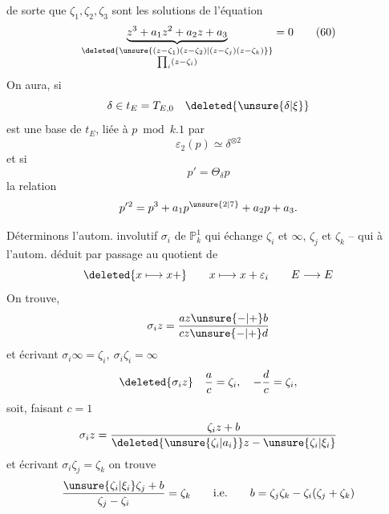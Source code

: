 de sorte que $\zeta_1,\zeta_2,\zeta_3$ sont les solutions de l'équation
\[
\underbrace{z^3+a_1z^2+a_2z+a_3}_{\substack{\deleted{\unsure{(z-\zeta_1)(z-\zeta_2)|(z-\zeta_j)(z-\zeta_k)}}\\\prod_i(z-\zeta_i)}}=0\tag*{(60)}
\]
On aura,  si
\[
\delta\in t_E=T_{E,0}\quad\deleted{\unsure{\delta|\xi}}
\]
est une base de $t_E$, liée à $p\bmod k.1$ par
\[
\varepsilon_2(p)\simeq\delta^{\otimes2}
\]
et si
\[
p'=\Theta_\delta p
\]
la relation
\[
p'{}^2=p^3+a_1p^{\unsure{2|7}}+a_2p+a_3.
\]

Déterminons l'autom. involutif $\sigma_i$ de $\mathbb{P}^1_k$ qui échange $\zeta_i$ et $\infty$, $\zeta_j$ et $\zeta_k$ -- qui  à l'autom. déduit par passage au quotient de
\[
\deleted{x\longmapsto x+}\qquad x\longmapsto x+\varepsilon_i\qquad E\longrightarrow E
\]
On trouve, 
\[
\sigma_i z=\frac{az\unsure{-|+}b}{cz\unsure{-|+}d}
\]
et écrivant $\sigma_i\infty=\zeta_i,\ \sigma_i\zeta_i=\infty$
\[
\deleted{\sigma_i z}\quad\frac ac=\zeta_i,\quad-\frac dc=\zeta_i,
\]
soit, faisant $c=1$
\[
\sigma_i z=\frac{\zeta_i z+b}{\deleted{\unsure{\zeta_i|a_i}}z-\unsure{\zeta_i|\xi_i}}
\]
et écrivant $\sigma_i\zeta_j=\zeta_k$ on trouve
\[
\frac{\unsure{\zeta_i|\xi_i}\zeta_j+b}{\zeta_j-\zeta_i}=\zeta_k\qquad\text{i.e.}\qquad b=\zeta_j\zeta_k-\zeta_i(\zeta_j+\zeta_k)
\]
